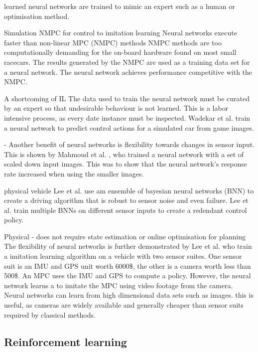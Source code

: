 learned neural networks are trained to mimic an expert such as a human or
optimisation method.

Simulation
\cite{Tatulea-Codrean2020} NMPC for control to imitation learning
Neural networks execute faster than non-linear MPC (NMPC) methods
NMPC methods are too computationally demanding for the on-board hardware found on most small racecars.
The results generated by the NMPC are used as a training data set for a neural network.
The neural network achieves performance competitive with the NMPC. 

\cite{Wadekar2021} 
A shortcoming of IL The data used to train the neural network must be curated by an expert so that undesirable behaviour is not learned.
This is a labor intensive process, as every date instance must be inspected.
Wadekar et al. \cite{Wadekar2021} train a neural network to predict control actions for a simulated car from game images.

\cite{Mahmoud2020} - 
Another benefit of neural networks is flexibility towards changes in sensor input.
This is shown by Mahmoud et al. \cite{Mahmoud2020}, who trained a neural network with a set of scaled down input images.
This was to show that the neural network's response rate increased when using the smaller images.

\cite{Lee2019} physical vehicle
Lee et al. \cite{Lee2019} use am ensemble of bayesian neural networks (BNN) to create a driving algorithm that is robust to sensor noise and even failure.
Lee et al. \cite{Lee2019} train multiple BNNs on different sensor inputs to create a redendant control policy.


Physical
\cite{Pan2017a} - does not require state estimation or online optimisation for planning
The flexibility of neural networks is further demonstrated by Lee et al. \cite{Pan2017a}
who train a imitation learning algorithm on a vehicle with two sensor suites.
One sensor suit is an IMU and GPS unit worth 6000\$, the other is a camera worth less than 500\$.
An MPC uses the IMU and GPS to compute a policy. 
However, the neural network learns a to imitate the MPC using video footage from the camera.
Neural networks can learn from high dimensional data sets such as images.
this is useful, as cameras are widely available and generally cheaper than sensor suits required by classical methods.


\subsection{Reinforcement learning}
\label{sec:reinforcement_learning}


